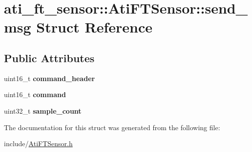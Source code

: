 \hypertarget{structati__ft__sensor_1_1AtiFTSensor_1_1send__msg}{}\section{ati\+\_\+ft\+\_\+sensor\+:\+:Ati\+F\+T\+Sensor\+:\+:send\+\_\+msg Struct Reference}
\label{structati__ft__sensor_1_1AtiFTSensor_1_1send__msg}
\subsection*{Public Attributes}
\begin{DoxyCompactItemize}
\item 
uint16\+\_\+t {\bfseries command\+\_\+header}\hypertarget{structati__ft__sensor_1_1AtiFTSensor_1_1send__msg_a17af1cc1fc1f2c47ec94657b6e2407a4}{}\label{structati__ft__sensor_1_1AtiFTSensor_1_1send__msg_a17af1cc1fc1f2c47ec94657b6e2407a4}

\item 
uint16\+\_\+t {\bfseries command}\hypertarget{structati__ft__sensor_1_1AtiFTSensor_1_1send__msg_ae0878bfd4d9aa9c4af111b3b0377b5e7}{}\label{structati__ft__sensor_1_1AtiFTSensor_1_1send__msg_ae0878bfd4d9aa9c4af111b3b0377b5e7}

\item 
uint32\+\_\+t {\bfseries sample\+\_\+count}\hypertarget{structati__ft__sensor_1_1AtiFTSensor_1_1send__msg_a37b2211c45156511d0ef4b1c192867b2}{}\label{structati__ft__sensor_1_1AtiFTSensor_1_1send__msg_a37b2211c45156511d0ef4b1c192867b2}

\end{DoxyCompactItemize}


The documentation for this struct was generated from the following file\+:\begin{DoxyCompactItemize}
\item 
include/\hyperlink{AtiFTSensor_8h}{Ati\+F\+T\+Sensor.\+h}\end{DoxyCompactItemize}
